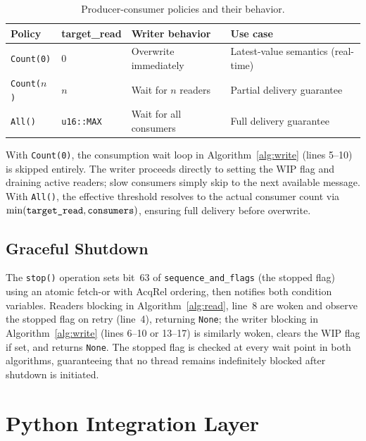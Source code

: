 \begin{table}[htbp]
    \centering
    \caption{Producer-consumer policies and their behavior.}
    \label{tab:policies}
    \small
    \begin{tabular}{l>{\raggedright}p{2.5cm}>{\raggedright}p{3.5cm}>{\raggedright\arraybackslash}p{4.5cm}}
        \toprule
        \textbf{Policy} & \textbf{target\_read} & \textbf{Writer behavior} & \textbf{Use case} \\
        \midrule
        \texttt{Count(0)} & 0 & Overwrite immediately & Latest-value semantics (real-time) \\
        \texttt{Count($n$)} & $n$ & Wait for $n$ readers & Partial delivery guarantee \\
        \texttt{All()} & \texttt{u16::MAX} & Wait for all consumers & Full delivery guarantee \\
        \bottomrule
    \end{tabular}
\end{table}

With \texttt{Count(0)}, the consumption wait loop in Algorithm~\ref{alg:write} (lines 5--10) is skipped entirely. The writer proceeds directly to setting the WIP flag and draining active readers; slow consumers simply skip to the next available message.
With \texttt{All()}, the effective threshold resolves to the actual consumer count via $\min(\text{\texttt{target\_read}}, \text{\texttt{consumers}})$, ensuring full delivery before overwrite.

\subsection{Graceful Shutdown}
\label{subsec:shutdown}

The \texttt{stop()} operation sets bit~63 of \texttt{sequence\_and\_flags} (the stopped flag) using an atomic fetch-or with AcqRel ordering, then notifies both condition variables. Readers blocking in Algorithm~\ref{alg:read}, line~8 are woken and observe the stopped flag on retry (line~4), returning \texttt{None}; the writer blocking in Algorithm~\ref{alg:write} (lines 6--10 or 13--17) is similarly woken, clears the WIP flag if set, and returns \texttt{None}.
The stopped flag is checked at every wait point in both algorithms, guaranteeing that no thread remains indefinitely blocked after shutdown is initiated.


\section{Python Integration Layer}
\label{sec:python_layer}

